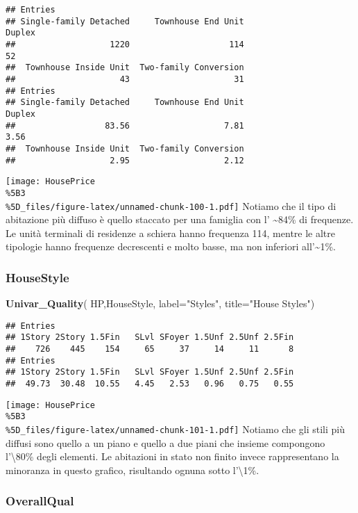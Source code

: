 \documentclass[
]{article}
\newenvironment{Shaded}{\begin{snugshade}}{\end{snugshade}}
\newcommand{\AttributeTok}[1]{\textcolor[rgb]{0.13,0.29,0.53}{#1}}
\newcommand{\FunctionTok}[1]{\textcolor[rgb]{0.13,0.29,0.53}{\textbf{#1}}}
\newcommand{\NormalTok}[1]{#1}
\newcommand{\StringTok}[1]{\textcolor[rgb]{0.31,0.60,0.02}{#1}}
\begin{document}
\begin{verbatim}
## Entries
## Single-family Detached     Townhouse End Unit                 Duplex 
##                   1220                    114                     52 
##  Townhouse Inside Unit  Two-family Conversion 
##                     43                     31 
## Entries
## Single-family Detached     Townhouse End Unit                 Duplex 
##                  83.56                   7.81                   3.56 
##  Townhouse Inside Unit  Two-family Conversion 
##                   2.95                   2.12
\end{verbatim}

\texttt{[image: HousePrice\\\%5B3\\\%5D\_files/figure-latex/unnamed-chunk-100-1.pdf]}
Notiamo che il tipo di abitazione più diffuso è quello staccato per una
famiglia con l' \textasciitilde84\% di frequenze. Le unità terminali di
residenze a schiera hanno frequenza 114, mentre le altre tipologie hanno
frequenze decrescenti e molto basse, ma non inferiori
all'\textasciitilde1\%.

\subsubsection{HouseStyle}\label{housestyle}

\begin{Shaded}
\begin{Highlighting}[]
\FunctionTok{Univar\_Quality}\NormalTok{(}
\NormalTok{  HP,HouseStyle,}
  \AttributeTok{label=}\StringTok{"Styles"}\NormalTok{,}
  \AttributeTok{title=}\StringTok{"House Styles"}\NormalTok{)}
\end{Highlighting}
\end{Shaded}

\begin{verbatim}
## Entries
## 1Story 2Story 1.5Fin   SLvl SFoyer 1.5Unf 2.5Unf 2.5Fin 
##    726    445    154     65     37     14     11      8 
## Entries
## 1Story 2Story 1.5Fin   SLvl SFoyer 1.5Unf 2.5Unf 2.5Fin 
##  49.73  30.48  10.55   4.45   2.53   0.96   0.75   0.55
\end{verbatim}

\texttt{[image: HousePrice\\\%5B3\\\%5D\_files/figure-latex/unnamed-chunk-101-1.pdf]}
Notiamo che gli stili più diffusi sono quello a un piano e quello a due
piani che insieme compongono l'\textbackslash80\% degli elementi. Le
abitazioni in stato non finito invece rappresentano la minoranza in
questo grafico, risultando ognuna sotto l'\textbackslash1\%.

\subsubsection{OverallQual}\label{overallqual}
\end{document}
